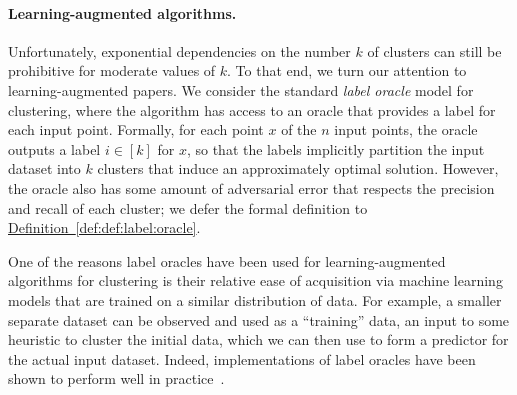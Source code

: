 \documentclass[11pt]{article}
\newcommand{\namedref}[2]{\hyperref[#2]{#1~\ref*{#2}}}
\newcommand{\defref}[1]{\namedref{Definition}{def:#1}}
\begin{document}
\paragraph{Learning-augmented algorithms.}
Unfortunately, exponential dependencies on the number $k$ of clusters can still be prohibitive for moderate values of $k$. 
To that end, we turn our attention to learning-augmented papers. 
We consider the standard \emph{label oracle} model for clustering, where the algorithm has access to an oracle that provides a label for each input point. 
Formally, for each point $x$ of the $n$ input points, the oracle outputs a label $i\in[k]$ for $x$, so that the labels implicitly partition the input dataset into $k$ clusters that induce an approximately optimal solution. 
However, the oracle also has some amount of adversarial error that respects the precision and recall of each cluster; we defer the formal definition to \defref{def:label:oracle}. 

One of the reasons label oracles have been used for learning-augmented algorithms for clustering is their relative ease of acquisition via machine learning models that are trained on a similar distribution of data. 
For example, a smaller separate dataset can be observed and used as a ``training'' data, an input to some heuristic to cluster the initial data, which we can then use to form a predictor for the actual input dataset. 
Indeed, implementations of label oracles have been shown to perform well in practice~\cite{ErgunFSWZ22,NguyenCN23}.
\end{document}
